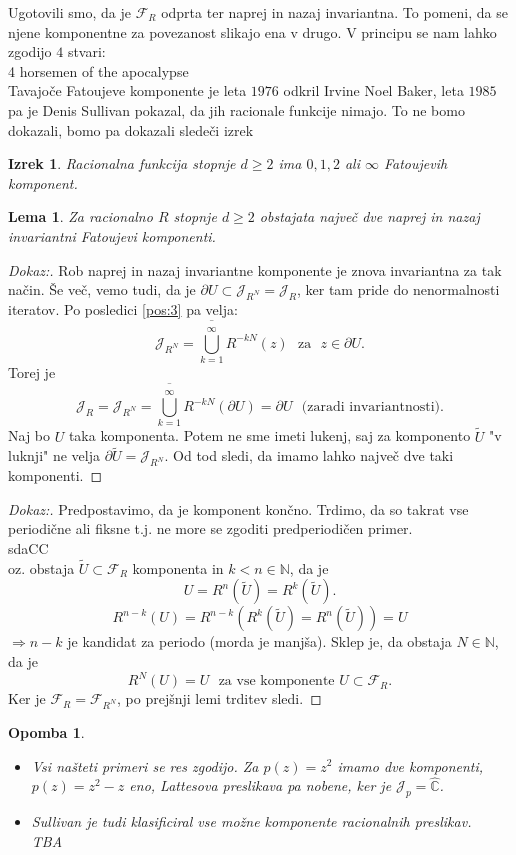 \documentclass{article}
\newtheorem{lema}{Lema}
\newtheorem{opomba}{Opomba}
\newtheorem{izrek}{Izrek}
\newcommand{\C}{\mathbb{C}}
\newcommand{\N}{\mathbb{N}}
\newcommand{\F}{\mathcal{F}}
\begin{document}
Ugotovili smo, da je $\F_R$ odprta ter naprej in nazaj invariantna.
To pomeni, da se njene komponentne za povezanost slikajo ena 
v drugo. V principu se nam lahko zgodijo $4$ stvari:\\
4 horsemen of the apocalypse\\

Tavajoče Fatoujeve komponente je leta $1976$ odkril Irvine Noel Baker, leta 
$1985$ pa je Denis Sullivan pokazal, da jih racionale funkcije nimajo. 
To ne bomo dokazali, bomo pa dokazali sledeči izrek
\begin{izrek}
Racionalna funkcija stopnje $d \geq 2$ ima $0, 1, 2$ ali $\infty$
Fatoujevih komponent.
\end{izrek}

\begin{lema}
Za racionalno $R$ stopnje $d \geq 2$ obstajata največ dve naprej in nazaj 
invariantni Fatoujevi komponenti.
\end{lema}

\begin{proof}[Dokaz:]
Rob naprej in nazaj invariantne komponente je znova invariantna za tak način. 
Še več, vemo tudi, da je $\partial U \subset \mathcal{J}_{R^N} = \mathcal{J}_R$, 
ker tam pride do nenormalnosti iteratov. Po posledici \ref{pos:3} pa velja:
$$
\mathcal{J}_{R^N} = \overline{\bigcup_{k=1}^\infty} R^{-kN}(z) \,\,\text{ za }\,\, z\in \partial U.
$$
Torej je
$$
\mathcal{J}_R = \mathcal{J}_{R^N} = \overline{\bigcup_{k=1}^\infty} R^{-kN}(\partial U) = \partial U \,\,\text{ (zaradi invariantnosti).}
$$
Naj bo $U$ taka komponenta. Potem ne sme imeti lukenj, saj za komponento $\tilde{U}$
"v luknji" ne velja $\partial \tilde{U} = \mathcal{J}_{R^N}$. Od tod sledi, 
da imamo lahko največ dve taki komponenti.
\end{proof}

\begin{proof}[Dokaz:]
    Predpostavimo, da je komponent končno. Trdimo, da so takrat 
    vse periodične ali fiksne t.j. ne more se zgoditi predperiodičen primer.\\
    sdaCC\\
    oz. obstaja $\tilde{U} \subset \F_R$ komponenta in $k < n\in \N$, da je 
    $$
    U = R^n(\tilde{U}) = R^k(\tilde{U}).
    $$
    $$
    R^{n-k}(U) = R^{n-k}(R^k(\tilde{U}) = R^n(\tilde{U})) = U     
    $$
    $\Longrightarrow n-k$ je kandidat za periodo (morda je manjša).
    Sklep je, da obstaja $N\in \N$, da je 
    $$
    R^N(U) = U \,\,\text{ za vse komponente $U \subset \F_R$}.
    $$
    Ker je $\F_R = \F_{R^N}$, po prejšnji lemi trditev sledi.
\end{proof}

\begin{opomba}
\hfill
\begin{itemize}
\item Vsi našteti primeri se res zgodijo. Za $p(z) = z^2$ imamo dve komponenti, 
$p(z) = z^2 - z$ eno, Lattesova preslikava pa nobene, ker je $\mathcal{J}_p = \hat{\C}$.
\item Sullivan je tudi klasificiral vse možne komponente racionalnih preslikav.\\
TBA
\end{itemize}
\end{opomba}
\end{document}
